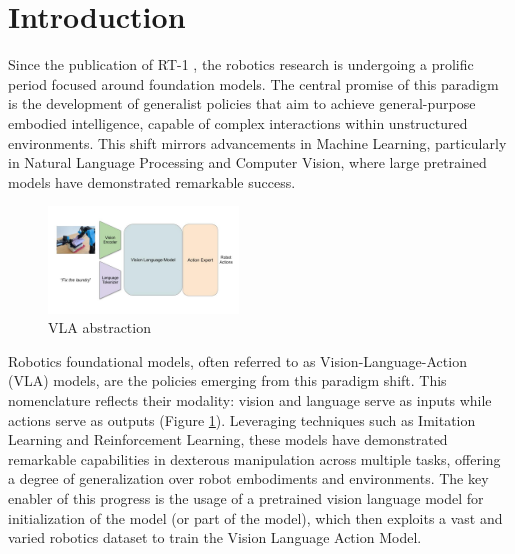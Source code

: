 \section{Introduction}

Since the publication of RT-1 \cite{RT-1}, the robotics research is undergoing a prolific period focused around foundation models. The central promise of this paradigm is the development of generalist policies that aim to achieve general-purpose embodied intelligence, capable of complex interactions within unstructured environments. This shift mirrors advancements in Machine Learning, particularly in Natural Language Processing and Computer Vision, where large pretrained models have demonstrated remarkable success.

\begin{figure}
    \vspace{-15pt}
    \centering
    \includegraphics[width=0.45\textwidth]{images/vla.jpg}
    \caption{VLA abstraction}
    \label{fig:vla_abstraction}
    \vspace{-15pt}
\end{figure}

Robotics foundational models, often referred to as Vision-Language-Action (VLA) models, are the policies 
emerging from this paradigm shift. This nomenclature reflects their modality: vision and language serve as inputs while 
actions serve as outputs (Figure \ref{fig:vla_abstraction}). Leveraging techniques such as Imitation Learning and 
Reinforcement Learning, these models have demonstrated remarkable capabilities in dexterous manipulation across multiple tasks, 
offering a degree of generalization over robot embodiments and environments. The key enabler of this progress is the 
usage of a pretrained vision language model for initialization of the model (or part of the model), which then 
exploits a vast and varied robotics dataset to train the Vision Language Action Model.

